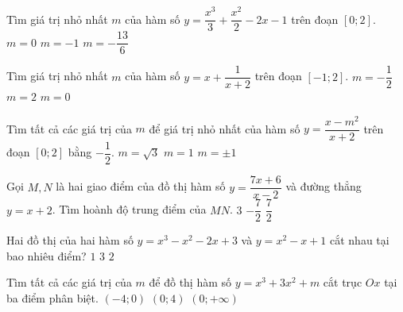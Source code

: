 \begin{ex}%
Tìm giá trị nhỏ nhất $m$ của hàm số $y=\dfrac{x^3}{3}+\dfrac{x^2}{2}-2x-1$ trên đoạn $[0;2]$.
{$m=0$}
{$m=-1$}
{\True $m=-\dfrac{13}{6}$}
\end{ex}

\begin{ex}%
	Tìm giá trị nhỏ nhất $m$ của hàm số $y=x+\dfrac{1}{x+2}$ trên đoạn $[-1;2]$.
	{$m=-\dfrac{1}{2}$}
	{$m=2$}
	{\True $m=0$}
\end{ex}

\begin{ex}%
Tìm tất cả các giá trị của $m$ để giá trị nhỏ nhất của hàm số $y=\dfrac{x-m^2}{x+2}$ trên đoạn $[0;2]$ bằng $-\dfrac{1}{2}$.
{$m=\sqrt{3}$}
{$m=1$}
{\True $m=\pm1$}
\end{ex}

\begin{ex}%
Gọi $M, N$ là hai giao điểm của đồ thị hàm số $y=\dfrac{7x+6}{x-2}$ và đường thẳng $y=x+2$. Tìm hoành độ trung điểm của $MN$.
{$3$}
{$-\dfrac{7}{2}$}
{\True $\dfrac{7}{2}$}
\end{ex}

\begin{ex}%
Hai đồ thị của hai hàm số $y=x^3-x^2-2x+3$ và $y=x^2-x+1$ cắt nhau tại bao nhiêu điểm?
{$1$}
{\True $3$}
{$2$}
\end{ex}

\begin{ex}%
Tìm tất cả các giá trị của $m$ để đồ thị hàm số $y=x^3+3x^2+m$ cắt trục $Ox$ tại ba điểm phân biệt.
{\True $(-4;0)$}
{$(0;4)$}
{$(0;+\infty)$}
\end{ex}

